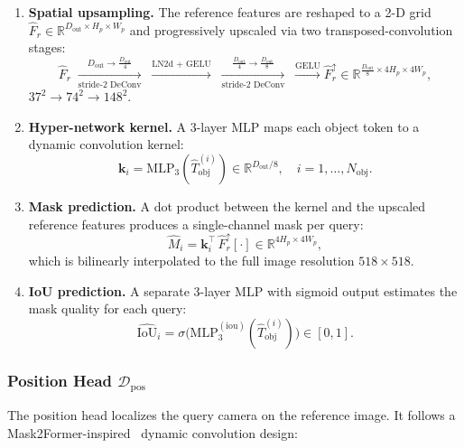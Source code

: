 \begin{enumerate}[leftmargin=*,topsep=2pt,itemsep=1pt]
\item \textbf{Spatial upsampling.}
      The reference features are reshaped to a 2-D grid
      $\hat{F}_r\in\mathbb{R}^{D_\text{out}\times H_p\times W_p}$
      and progressively upscaled via two transposed-convolution stages:
      \begin{equation}
        \hat{F}_r
          \;\xrightarrow[\text{stride-2 DeConv}]{D_\text{out}{\to}\tfrac{D_\text{out}}{4}}
          \;\xrightarrow{\text{LN2d + GELU}}
          \;\xrightarrow[\text{stride-2 DeConv}]{\tfrac{D_\text{out}}{4}{\to}\tfrac{D_\text{out}}{8}}
          \;\xrightarrow{\text{GELU}}
          \hat{F}_r^{\uparrow}
          \in \mathbb{R}^{\tfrac{D_\text{out}}{8}\times 4H_p\times 4W_p},
      \end{equation}
      \ie $37^2\!\to\!74^2\!\to\!148^2$.

\item \textbf{Hyper-network kernel.}
      A 3-layer MLP maps each object token to a dynamic convolution kernel:
      \begin{equation}
        \mathbf{k}_i = \text{MLP}_3(\hat{T}_\text{obj}^{(i)})
                       \in \mathbb{R}^{D_\text{out}/8},
        \quad i=1,\dots,N_\text{obj}.
      \end{equation}

\item \textbf{Mask prediction.}
      A dot product between the kernel and the upscaled reference
      features produces a single-channel mask per query:
      \begin{equation}
        \hat{M}_i = \mathbf{k}_i^\top\,
                    \hat{F}_r^{\uparrow}[\cdot]
                    \in \mathbb{R}^{4H_p\times 4W_p},
      \end{equation}
      which is bilinearly interpolated to the full image resolution
      $518{\times}518$.

\item \textbf{IoU prediction.}
      A separate 3-layer MLP with sigmoid output estimates the mask
      quality for each query:
      \begin{equation}
        \widehat{\text{IoU}}_i
          = \sigma\!\bigl(\text{MLP}_3^{(\text{iou})}(\hat{T}_\text{obj}^{(i)})\bigr)
          \in [0,1].
      \end{equation}
\end{enumerate}

\subsubsection{Position Head $\mathcal{D}_\text{pos}$}
\label{sec:supp_pos_head}
The position head localizes the query camera on the reference image.
It follows a Mask2Former-inspired~\cite{mask2former} dynamic convolution design:

